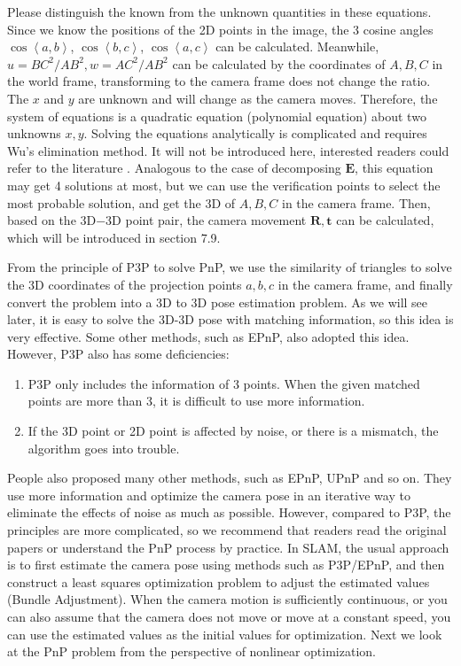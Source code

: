 Please distinguish the known from the unknown quantities in these equations. Since we know the positions of the 2D points in the image, the 3 cosine angles $\cos \left \langle a,b \right \rangle$, $\cos \left\langle b,c \right \rangle$, $\cos \left \langle a,c \right \rangle$ can be calculated. Meanwhile, $u=BC^2/AB^2, w=AC^2/AB^2$ can be calculated by the coordinates of $A, B, C$ in the world frame, transforming to the camera frame does not change the ratio. The $x$ and $y$ are unknown and will change as the camera moves. Therefore, the system of equations is a quadratic equation (polynomial equation) about two unknowns $x, y$. Solving the equations analytically is complicated and requires Wu's elimination method. It will not be introduced here, interested readers could refer to the literature \cite{GaoHouTangEtAl2003}. Analogous to the case of decomposing $\mathbf{E}$, this equation may get 4 solutions at most, but we can use the verification points to select the most probable solution, and get the 3D of $A, B, C$ in the camera frame. Then, based on the 3D−3D point pair, the camera movement $\mathbf{R}, \mathbf{t}$ can be calculated, which will be introduced in section 7.9.

From the principle of P3P to solve PnP, we use the similarity of triangles to solve the 3D coordinates of the projection points $a, b, c$ in the camera frame, and finally convert the problem into a 3D to 3D pose estimation problem. As we will see later, it is easy to solve the 3D-3D pose with matching information, so this idea is very effective. Some other methods, such as EPnP, also adopted this idea. However, P3P also has some deficiencies:

\begin{enumerate}
	\item P3P only includes the information of 3 points. When the given matched points are more than 3, it is difficult to use more information.
	\item If the 3D point or 2D point is affected by noise, or there is a mismatch, the algorithm goes into trouble.
\end{enumerate}

People also proposed many other methods, such as EPnP, UPnP and so on. They use more information and optimize the camera pose in an iterative way to eliminate the effects of noise as much as possible. However, compared to P3P, the principles are more complicated, so we recommend that readers read the original papers or understand the PnP process by practice. In SLAM, the usual approach is to first estimate the camera pose using methods such as P3P/EPnP, and then construct a least squares optimization problem to adjust the estimated values (Bundle Adjustment). When the camera motion is sufficiently continuous, or you can also assume that the camera does not move or move at a constant speed, you can use the estimated values as the initial values for optimization. Next we look at the PnP problem from the perspective of nonlinear optimization.

